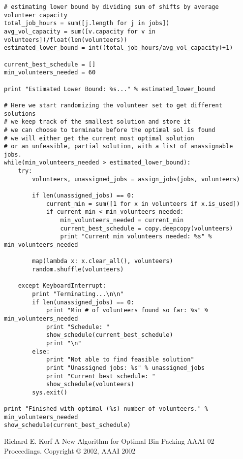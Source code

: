 \documentclass[11pt]{article}
\theoremstyle{definition}
\begin{document}
\begin{lstlisting}
# estimating lower bound by dividing sum of shifts by average volunteer capacity
total_job_hours = sum([j.length for j in jobs])
avg_vol_capacity = sum([v.capacity for v in volunteers])/float(len(volunteers))
estimated_lower_bound = int((total_job_hours/avg_vol_capacity)+1)

current_best_schedule = []
min_volunteers_needed = 60

print "Estimated Lower Bound: %s..." % estimated_lower_bound

# Here we start randomizing the volunteer set to get different solutions
# we keep track of the smallest solution and store it
# we can choose to terminate before the optimal sol is found
# we will either get the current most optimal solution
# or an unfeasible, partial solution, with a list of anassignable jobs.
while(min_volunteers_needed > estimated_lower_bound):
    try:
        volunteers, unassigned_jobs = assign_jobs(jobs, volunteers)

        if len(unassigned_jobs) == 0:
            current_min = sum([1 for x in volunteers if x.is_used])
            if current_min < min_volunteers_needed:
                min_volunteers_needed = current_min
                current_best_schedule = copy.deepcopy(volunteers)
                print "Current min volunteers needed: %s" % min_volunteers_needed

        map(lambda x: x.clear_all(), volunteers)
        random.shuffle(volunteers)

    except KeyboardInterrupt:
        print "Terminating...\n\n"
        if len(unassigned_jobs) == 0:
            print "Min # of volunteers found so far: %s" % min_volunteers_needed
            print "Schedule: "
            show_schedule(current_best_schedule)
            print "\n"
        else:
            print "Not able to find feasible solution"
            print "Unassigned jobs: %s" % unassigned_jobs
            print "Current best schedule: "
            show_schedule(volunteers)
        sys.exit()

print "Finished with optimal (%s) number of volunteers." % min_volunteers_needed
show_schedule(current_best_schedule)
\end{lstlisting}

\begin{thebibliography}{9}
	Richard E. Korf
	A New Algorithm for Optimal Bin Packing
	AAAI-02 Proceedings. Copyright © 2002, AAAI
	2002

\end{thebibliography}
\end{document}
